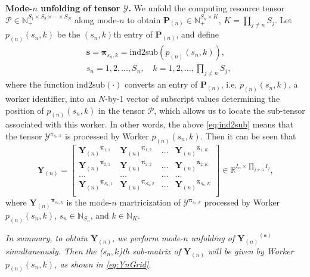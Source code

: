 \documentclass[10pt,twocolumn,twoside]{IEEEtran}
\newcommand{\mat}[1]{\ensuremath{\mathbf{#1}}}
\newcommand{\tensor}[1]{\ensuremath{\boldsymbol{\mathscr{#1}}}}
\newcommand{\tenmat}[2][n]{\ensuremath{{\mathbf{#2}}_{(#1)}}}
\newcommand{\Real}{\ensuremath{\mathbb{R}}}
\newcommand{\Natural}{\ensuremath{\mathbb{N}}}
\begin{document}
{\bf Mode-$n$ unfolding of tensor \tensor{Y}.} 
We unfold the computing resource tensor $\tensor{P}\in\Natural^{S_1\times S_2\times\cdots\times S_N}_+$ along mode-$n$ to obtain $\tenmat{P}\in\Natural^{S_n\times K}_+$, $K=\prod_{j\neq n}S_j$. Let $p_{(n)}(s_n,k)$  be the $(s_n,k)$th entry of $\tenmat{P}$, and define
\begin{equation}
\label{eq:ind2sub}
\begin{split}
& \mat{s} =\boldsymbol{\pi}_{s_n,k}=\text{ind2sub}(p_{(n)}(s_n,k)),\\
& s_n=1,2,\ldots,S_n, \quad k=1,2,\ldots,\prod\nolimits_{j\neq n}S_j,
\end{split}
\end{equation}
where the function $\text{ind2sub}(\cdot)$ converts  an entry of \tenmat{P}, i.e. $p_{(n)}(s_n,k)$, a worker identifier, into an $N$-by-1 vector of subscript values determining the position  of $p_{(n)}(s_n,k)$ in the tensor \tensor{P}, which allows us to locate the sub-tensor associated with this worker. In other words, the above \eqref{eq:ind2sub} means that the tensor $\tensor{Y}^{\pi_{s_n,k}}$  is processed by Worker $p_{(n)}(s_n,k)$. Then it can be seen that
\begin{equation}
\label{eq:YnGrid}
\tenmat{{Y}}=\begin{bmatrix}
\tenmat{Y}^{\boldsymbol{\pi}_{1,1}} & \tenmat{Y}^{\boldsymbol{\pi}_{1,2}} & \ldots & \tenmat{Y}^{\boldsymbol{\pi}_{1,K} } \\
\tenmat{Y}^{\boldsymbol{\pi}_{2,1}} & \tenmat{Y}^{\boldsymbol{\pi}_{2,2}} & \ldots & \tenmat{Y}^{\boldsymbol{\pi}_{2,K} } \\
\ldots & \ldots & \ldots & \ldots \\
\tenmat{Y}^{\boldsymbol{\pi}_{S_n,1}} & \tenmat{Y}^{\boldsymbol{\pi}_{S_n,2}} & \ldots & \tenmat{Y}^{\boldsymbol{\pi}_{S_n,K} } \\
\end{bmatrix}\in\Real^{I_n\times\prod_{j\neq n}I_j},
\end{equation}
where $\tenmat{Y}^{\boldsymbol{\pi}_{s_n,k}}$ is the mode-$n$ martricization of $\tensor{Y}^{\boldsymbol{\pi}_{s_n,k}}$ processed by  Worker $p_{(n)}(s_n,k)$, $s_n\in\Natural_{S_n}$, and $k\in\Natural_K$. 

\emph{In summary, to obtain \tenmat{Y}, we  perform mode-$n$ unfolding of $\tenmat{Y}^{(\mat{s})}$ simultaneously. 
Then the ($s_n,k$)th sub-matrix of \tenmat{Y} will be given by Worker $p_{(n)}(s_n,k)$, as shown in \eqref{eq:YnGrid}.}
\end{document}
